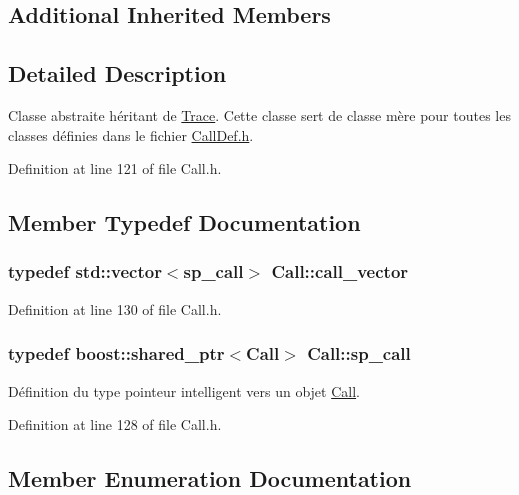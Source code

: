 \subsection*{Additional Inherited Members}


\subsection{Detailed Description}
Classe abstraite héritant de \hyperlink{class_trace}{Trace}. Cette classe sert de classe mère pour toutes les classes définies dans le fichier \hyperlink{_call_def_8h}{Call\+Def.\+h}. 

Definition at line 121 of file Call.\+h.



\subsection{Member Typedef Documentation}
\subsubsection[{\texorpdfstring{call\+\_\+vector}{call_vector}}]{\setlength{\rightskip}{0pt plus 5cm}typedef std\+::vector$<${\bf sp\+\_\+call}$>$ {\bf Call\+::call\+\_\+vector}}\hypertarget{class_call_aa446a4316c03fb722ab10d0e1da33643}{}\label{class_call_aa446a4316c03fb722ab10d0e1da33643}


Definition at line 130 of file Call.\+h.

\subsubsection[{\texorpdfstring{sp\+\_\+call}{sp_call}}]{\setlength{\rightskip}{0pt plus 5cm}typedef boost\+::shared\+\_\+ptr$<${\bf Call}$>$ {\bf Call\+::sp\+\_\+call}}\hypertarget{class_call_a4c0609ade3e9bd1366499e2f64f6e0a2}{}\label{class_call_a4c0609ade3e9bd1366499e2f64f6e0a2}
Définition du type pointeur intelligent vers un objet \hyperlink{class_call}{Call}. 

Definition at line 128 of file Call.\+h.



\subsection{Member Enumeration Documentation}
